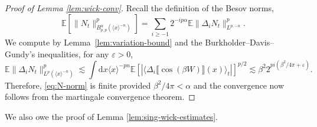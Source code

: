 \documentclass[11pt, a4paper]{scrartcl}
\numberwithin{equation}{section}
\theoremstyle{plain}
\theoremstyle{remark}
\newcommand{\mathd}{\mathrm{d}}
\begin{document}
\begin{proof}[Proof of Lemma \ref{lem:wick-conv}]
	Recall the definition of the Besov norms,
	\begin{equation}
		\mathbb{E} [\| N_t \|_{B_{p, p}^{\alpha} (\langle x \rangle^{- n})}^p] =
		\sum_{i \geqslant - 1} 2^{- ip \alpha} \mathbb{E} \| \Delta_i N_t
		\|_{L^{p, - n}}^p . \label{eq:N-norm}
	\end{equation}
	We compute by Lemma~\ref{lem:variation-bound} and the
	Burkholder--Davis--Gundy's inequalities, for any $\varepsilon > 0$,
	\[ \mathbb{E} \| \Delta_i N_t \|_{L^p (\langle x \rangle^{- n})}^p \lesssim
		\int \mathd x \langle x \rangle^{- pn} \mathbb{E} [| \langle \Delta_i
			\llbracket \cos (\beta W) \rrbracket (x) \rangle_t |]^{p / 2} \lesssim
		\beta^2 2^{pi (\beta^2 / 4 \pi + \varepsilon)} . \]
	Therefore, \eqref{eq:N-norm} is finite provided $\beta^2 / 4 \pi < \alpha$
	and the convergence now follows from the martingale convergence theorem.
\end{proof}

We also owe the proof of Lemma \ref{lem:sing-wick-estimates}.
\end{document}
